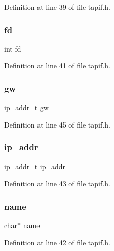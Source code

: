 Definition at line 39 of file tapif.\+h.

\hypertarget{structtapif_a6f8059414f0228f0256115e024eeed4b}{}\label{structtapif_a6f8059414f0228f0256115e024eeed4b} 
\subsubsection{\texorpdfstring{fd}{fd}}
{\footnotesize\ttfamily int fd}



Definition at line 41 of file tapif.\+h.

\hypertarget{structtapif_a539bd220ca3c77f244f067a64b88eedb}{}\label{structtapif_a539bd220ca3c77f244f067a64b88eedb} 
\subsubsection{\texorpdfstring{gw}{gw}}
{\footnotesize\ttfamily ip\+\_\+addr\+\_\+t gw}



Definition at line 45 of file tapif.\+h.

\hypertarget{structtapif_a9e94eab4b5236fa02039f5e5c3a954ff}{}\label{structtapif_a9e94eab4b5236fa02039f5e5c3a954ff} 
\subsubsection{\texorpdfstring{ip\+\_\+addr}{ip\_addr}}
{\footnotesize\ttfamily ip\+\_\+addr\+\_\+t ip\+\_\+addr}



Definition at line 43 of file tapif.\+h.

\hypertarget{structtapif_a5ac083a645d964373f022d03df4849c8}{}\label{structtapif_a5ac083a645d964373f022d03df4849c8} 
\subsubsection{\texorpdfstring{name}{name}}
{\footnotesize\ttfamily char$\ast$ name}



Definition at line 42 of file tapif.\+h.

\hypertarget{structtapif_a5a6e0aa9b45e8b67ba88d750ab4e0537}{}\label{structtapif_a5a6e0aa9b45e8b67ba88d750ab4e0537} 
